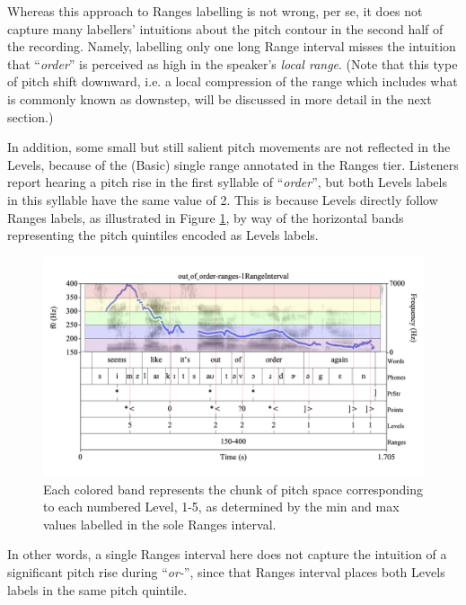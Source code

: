 \documentclass[11pt, twoside]{memoir}
\def\langtext#1{\textit{#1}}
\begin{document}
Whereas this approach to Ranges labelling is not wrong, per se, it does not capture many labellers’ intuitions about the pitch contour in the second half of the recording. Namely, labelling only one long Range interval misses the intuition that “\langtext{order}” is perceived as high in the speaker’s \emph{local range}. (Note that this type of pitch shift downward, i.e. a local compression of the range which includes what is commonly known as downstep, will be discussed in more detail in the next section.)

In addition, some small but still salient pitch movements are not reflected in the Levels, because of the (Basic) single range annotated in the Ranges tier. Listeners report hearing a pitch rise in the first syllable of “\langtext{order}”, but both Levels labels in this syllable have the same value of 2. This is because Levels directly follow Ranges labels, as illustrated in Figure \ref{fig:out_of_order-ranges rainbow Ranges Adv}, by way of the horizontal bands representing the pitch quintiles encoded as Levels labels.

\begin{figure}[H]
\centering
%
\includegraphics[width=.875\linewidth]{out_of_order-ranges-1RangeInterval-rainbow.png}
%
\caption[Each colored band represents the chunk of pitch space corresponding to each numbered Level, 1-5.]{Each colored band represents the chunk of pitch space corresponding to each numbered Level, 1-5, as determined by the min and max values labelled in the sole Ranges interval.%
\label{fig:out_of_order-ranges rainbow Ranges Adv}%
}
\end{figure}

In other words, a single Ranges interval here does not capture the intuition of a significant pitch rise during “\langtext{or-}”, since that Ranges interval places both Levels labels in the same pitch quintile.
\end{document}
